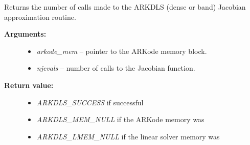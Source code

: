 \documentclass[letterpaper,10pt,english]{sphinxmanual}
\begin{document}
\begin{fulllineitems}
\label{c_interface/User_callable:c.ARKDlsGetNumJacEvals}
Returns the number of calls made to the ARKDLS
(dense or band) Jacobian approximation routine.
\begin{description}
\item[{\textbf{Arguments:}}] \leavevmode\begin{itemize}
\item {} 
\emph{arkode\_mem} -- pointer to the ARKode memory block.

\item {} 
\emph{njevals} -- number of calls to the Jacobian function.

\end{itemize}

\item[{\textbf{Return value:}}] \leavevmode\begin{itemize}
\item {} 
\emph{ARKDLS\_SUCCESS} if successful

\item {} 
\emph{ARKDLS\_MEM\_NULL} if the ARKode memory was 

\item {} 
\emph{ARKDLS\_LMEM\_NULL} if the linear solver memory was 

\end{itemize}

\end{description}

\end{fulllineitems}

\end{document}
